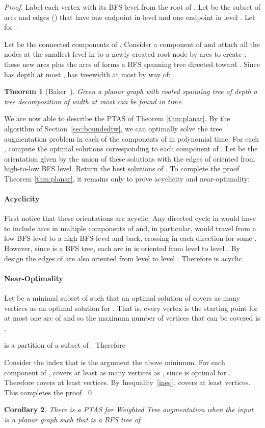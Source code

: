 \documentclass{article}
\newtheorem{theorem}{Theorem}
\newtheorem{cor}[theorem]{Corollary}
\begin{document}
\begin{proof}
Label each vertex with its BFS level from the root of .  Let
 be the subset of arcs and edges () that have one
endpoint in level  and one endpoint in level .  Let  for .

Let  be the connected components of .  Consider a component  of  and attach
all the nodes at the smallest level in  to a newly created root
node  by arcs to create ; these new arcs plus the arcs of
 forms a BFS spanning tree  directed toward
.  Since  has depth at most ,  has treewidth at
most  by way of:
\begin{theorem}[Baker~\cite{Baker1994}]
  Given a planar graph  with rooted spanning tree of depth  a
  tree decomposition of width at most  can be found in 
  time.
\end{theorem}


We are now able to describe the PTAS of Theorem \ref{thm:planar}.
By the algorithm of Section~\ref{sec:boundedtw}, we can optimally solve the {\sc tree augmentation} problem in each of the components of  in polynomial time. 
For each , compute the optimal solutions corresponding to each component of .  
Let  be the orientation given by the union of these solutions with the edges of  oriented from high-to-low BFS level.  
Return the best solutions of .
To complete the proof Theorem \ref{thm:planar}, it remains only to prove acyclicity and near-optimality:
\paragraph{Acyclicity} First notice that these orientations are
acyclic.  Any directed cycle in  would have to
include arcs in multiple components of  and, in
particular, would travel from a low BFS-level to a high
BFS-level and back, crossing  in each direction for some .  However, since  is a BFS tree, each arc in  is oriented from level  to level .  By design the edges
of  are also oriented from level  to level .
Therefore  is acyclic.
\paragraph{Near-Optimality} Let  be a minimal subset of  such that an optimal solution
 of  covers as many vertices
as an optimal solution for .  That is, every
vertex is the starting point for at most one arc of  and
so the maximum number of vertices that can be covered is .

 is a partition of a subset of .  Therefore

Consider the index  that is the argument the above minimum.
For each component  of , 
covers at least as many vertices as , since  is optimal for .  Therefore  covers
at least  vertices.  By
Inequality~\ref{ineq},  covers at least  vertices.
This completes the proof.
\qed \end{proof}
\begin{cor}
There is a PTAS for {\sc Weighted Tree augmentation} when the input is
a planar graph  such that  is a BFS
tree of .
\end{cor}
\end{document}
